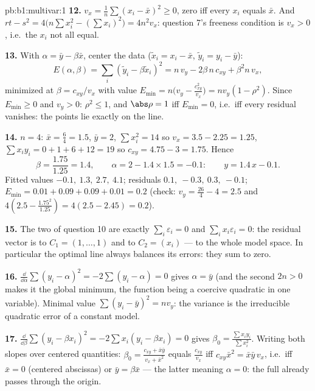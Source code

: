 \begin{solution}{pb:b1:multivar:1}
\textbf{12.} $v_x = \frac1n\sum(x_i - \bar x)^2 \geq 0$, zero
iff every $x_i$ equals $\bar x$. And $rt - s^2 = 4\bigl(n\sum
x_i^2 - (\sum x_i)^2\bigr) = 4n^2 v_x$: question 7's freeness
condition is $v_x > 0$, i.e.\ the $x_i$ not all equal.

\textbf{13.} With $\alpha = \bar y - \beta\bar x$, center the
data ($\tilde x_i = x_i - \bar x$, $\tilde y_i = y_i - \bar y$):
\[
E(\alpha, \beta) = \sum_i(\tilde y_i - \beta\tilde x_i)^2
= n\,v_y - 2\beta\,n\,c_{xy} + \beta^2 n\,v_x ,
\]
minimized at $\beta = c_{xy}/v_x$ with value $E_{\min} =
n\bigl(v_y - \frac{c_{xy}^2}{v_x}\bigr) = n v_y(1 - \rho^2)$.
Since $E_{\min} \geq 0$ and $v_y > 0$: $\rho^2 \leq 1$, and
$\abs\rho = 1$ iff $E_{\min} = 0$, i.e.\ iff every residual
vanishes: the points lie exactly on the line.

\textbf{14.} $n = 4$: $\bar x = \frac64 = 1.5$, $\bar y = 2$,
$\sum x_i^2 = 14$ so $v_x = 3.5 - 2.25 = 1.25$, $\sum x_iy_i =
0 + 1 + 6 + 12 = 19$ so $c_{xy} = 4.75 - 3 = 1.75$. Hence
\[
\beta = \frac{1.75}{1.25} = 1.4,
\qquad
\alpha = 2 - 1.4\times1.5 = -0.1 :
\qquad y = 1.4\,x - 0.1 .
\]
Fitted values $-0.1,\ 1.3,\ 2.7,\ 4.1$; residuals $0.1,\ -0.3,\
0.3,\ -0.1$; $E_{\min} = 0.01 + 0.09 + 0.09 + 0.01 = 0.2$
(check: $v_y = \frac{26}4 - 4 = 2.5$ and $4(2.5 -
\frac{1.75^2}{1.25}) = 4(2.5 - 2.45) = 0.2$).

\textbf{15.} The two  of question 10 are
exactly $\sum_i\varepsilon_i = 0$ and $\sum_i x_i\varepsilon_i =
0$: the residual vector is  to $C_1 = (1, \dots, 1)$
and to $C_2 = (x_i)$ --- to the whole model space. In
particular the optimal line always balances its errors: they
sum to zero.

\textbf{16.} $\frac{\dd}{\dd\alpha}\sum(y_i - \alpha)^2 =
-2\sum(y_i - \alpha) = 0$ gives $\alpha = \bar y$ (and the
second  $2n > 0$ makes it the global minimum, the
function being a coercive quadratic in one variable). Minimal
value $\sum(y_i - \bar y)^2 = n v_y$: the variance is the
irreducible quadratic error of a constant model.

\textbf{17.} $\frac{\dd}{\dd\beta}\sum(y_i - \beta x_i)^2 =
-2\sum x_i(y_i - \beta x_i) = 0$ gives $\beta_0 = \frac{\sum
x_iy_i}{\sum x_i^2}$. Writing both slopes over centered
quantities: $\beta_0 = \frac{c_{xy} + \bar x\bar y}{v_x + \bar
x^2}$ equals $\frac{c_{xy}}{v_x}$ iff $c_{xy}\bar x^2 = \bar
x\bar y\,v_x$, i.e.\ iff $\bar x = 0$ (centered abscissas) or
$\bar y = \beta\bar x$ --- the latter meaning $\alpha = 0$: the
full  already passes through the origin.


\end{solution}
